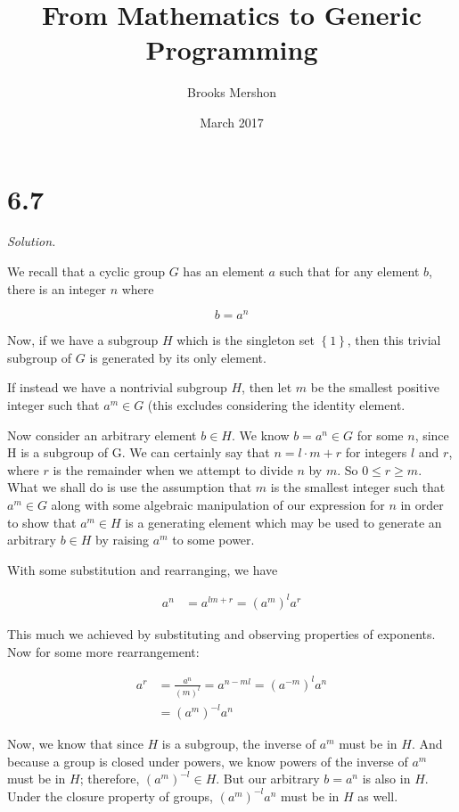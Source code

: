 \documentclass{article}
\title{From Mathematics to Generic Programming}
\author{Brooks Mershon}
\date{March 2017}
\begin{document}
\maketitle

\section*{6.7}

\textit{Solution.}

We recall that a cyclic group $G$ has an element $a$ such that for any element $b$, there is an integer $n$ where

$$b = a^n$$

Now, if we have a subgroup $H$ which is the singleton set $\left\{ 1 \right\}$, then this trivial subgroup of $G$ is generated by its only element.

If instead we have a nontrivial subgroup $H$, then let $m$ be the smallest positive integer such that $a^m \in G$ (this excludes considering the identity element.

Now consider an arbitrary element $b \in H$. We know $b = a^n \in G$ for some $n$, since H is a subgroup of G. We can certainly say that $n = l \cdot m + r$ for integers $l$ and $r$, where $r$ is the remainder when we attempt to divide $n$ by $m$. So $0 \leq r \geq m$. What we shall do is use the assumption that $m$ is the smallest integer such that $a^m \in G$ along with some algebraic manipulation of our expression for $n$ in order to show that $a^m \in H$ is a generating element which may be used to generate an arbitrary $b \in H$ by raising $a^m$ to some power.

With some substitution and rearranging, we have

\begin{align*}
    a^n &= a^{lm + r} = \left(a^m\right)^l a^r
\end{align*}

This much we achieved by substituting and observing properties of exponents. Now for some more rearrangement:


\begin{align*}
    a^r &= \frac{a^n}{\left( m \right)^l} = a^{n - ml} = \left(a^{-m}\right)^l a^n \\
        &=  \left(a^m \right)^{-l} a^n
\end{align*}

Now, we know that since $H$ is a subgroup, the inverse of $a^m$ must be in $H$. And because a group is closed under powers, we know powers of the inverse of $a^m$ must be in $H$; therefore, $\left(a^m\right)^{-l} \in H$. But our arbitrary $b = a^n$ is also in $H$. Under the closure property of groups, $\left(a^m \right)^{-l} a^n$ must be in $H$ as well.
\end{document}
